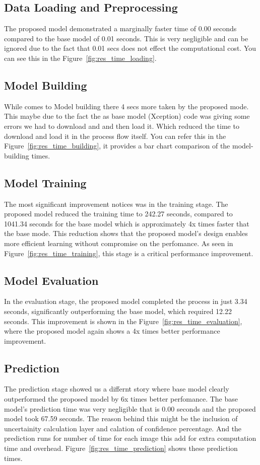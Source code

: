 \documentclass[12pt,onecolumn]{report}
\begin{document}
\subsection{Data Loading and Preprocessing}
The proposed model demonstrated a marginally faster time of 0.00 seconds compared to the base model of 0.01 seconds. This is very negligible and can be ignored due to the fact that 0.01 secs does not effect the computational cost. You can see this in the Figure~\ref{fig:res_time_loading}.

\subsection{Model Building}
While comes to Model building there 4 secs more taken by the proposed mode. This maybe due to the fact the as base model (Xception) code was giving some errors we had to download and and then load it. Which reduced the time to download and load it in the process flow itself. You can refer this in the Figure~\ref{fig:res_time_building}, it provides a bar chart comparison of the model-building times.

\subsection{Model Training}
The most significant improvement notices was in the training stage. The proposed model reduced the training time to 242.27 seconds, compared to 1041.34 seconds for the base model which is approximately 4x times faster that the base mode. This reduction shows that the proposed model's design enables more efficient learning without compromise on the perfomance. As seen in Figure~\ref{fig:res_time_training}, this stage is a critical performance improvement.

\subsection{Model Evaluation}
In the evaluation stage, the proposed model completed the process in just 3.34 seconds, significantly outperforming the base model, which required 12.22 seconds. This improvement is shown in the Figure~\ref{fig:res_time_evaluation}, where the proposed model again shows a 4x times better performance improvement.

\subsection{Prediction}
The prediction stage showed us a differnt story where base model clearly outperformed the proposed model by 6x times better perfomance. The base model's prediction time was very negligible that is 0.00 seconds and the proposed model took 67.59 seconds. The reason behind this might be the inclusion of uncertainity calculation layer and calation of confidence percentage. And the prediction runs for number of time for each image this add for extra computation time and overhead. Figure~\ref{fig:res_time_prediction} shows these prediction times.
\end{document}
